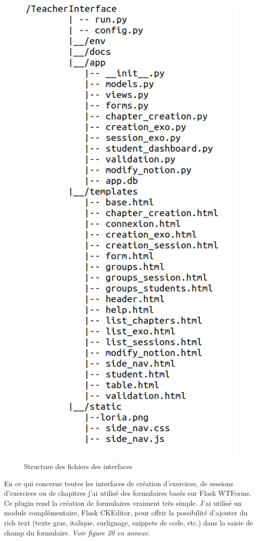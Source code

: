 \documentclass[12pt]{article}
\begin{document}
\begin{figure}[h]
    \centering
    \includegraphics[scale=0.4]{structure_Flask.png}
    \caption{Structure des fichiers des interfaces}
    \label{fig:structure_flask}
\end{figure}


En ce qui concerne toutes les interfaces de création d’exercices, de sessions d’exercices ou de chapitres j’ai utilisé des formulaires basés sur Flask WTForms. Ce plugin rend la création de formulaires vraiment très simple. J'ai utilisé un module complémentaire, Flask CKEditor, pour offrir la possibilité d'ajouter du rich text (texte gras, italique, surlignage, snippets de code, etc.) dans la saisie de champ du formulaire. \textit{Voir figure 20 en annexe.} \\ 
\end{document}
